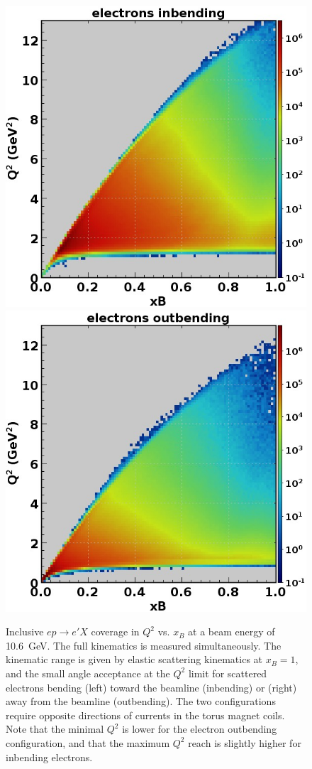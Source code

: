 \documentclass[final,3p,twocolumn]{elsarticle}
\begin{document}
\begin{figure}[th!]
\centerline{\includegraphics[width=0.9\columnwidth]{epX-in.jpg}
\hspace{1cm}\includegraphics[width=0.9\columnwidth]{epX-out.jpg}}
\caption{Inclusive $ep \to e'X$ coverage in $Q^2$ vs. $x_B$ at a beam energy of 10.6~GeV. The full kinematics is
  measured simultaneously. The kinematic range is given by elastic scattering kinematics at $x_B = 1$, and the small
  angle acceptance at the $Q^2$ limit for scattered electrons bending (left) toward the beamline (inbending) or (right)
  away from the beamline (outbending). The two configurations require opposite directions of currents in the torus
  magnet coils. Note that the minimal $Q^2$ is lower for the electron outbending configuration, and that the maximum
  $Q^2$ reach is slightly higher for inbending electrons.} 
\label{electron-acceptance}
\end{figure}
\end{document}

